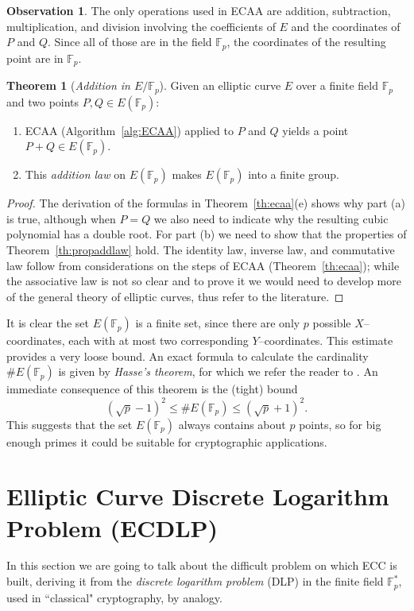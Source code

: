 \documentclass[9pt]{article}
\theoremstyle{definition}
\newtheorem{theorem}{Theorem}[section]
\newtheorem*{observation}{Observation}
\begin{document}
\begin{observation}
	The only operations used in ECAA are addition, subtraction, multiplication, and division involving the coefficients of $E$ and the coordinates of $P$ and $Q$. Since all of those are in the field $\mathbb{F}_p$, the coordinates of the resulting point are in $\mathbb{F}_p$.
\end{observation}

\begin{theorem}[\textit{Addition in $E/\mathbb{F}_p$}]
	Given an elliptic curve $E$ over a finite field $\mathbb{F}_p$ and two points $P, Q \in E(\mathbb{F}_p)$:
	\begin{enumerate}[label=(\alph*)]
		\item ECAA (Algorithm~\ref{alg:ECAA}) applied to $P$ and $Q$ yields a point $P + Q \in E(\mathbb{F}_p)$.
		\item This \textit{addition law} on $E(\mathbb{F}_p)$ makes $E(\mathbb{F}_p)$ into a finite group.
	\end{enumerate}
\end{theorem}
\begin{proof}
	The derivation of the formulas in Theorem~\ref{th:ecaa}(e) shows why part (a) is true, although when $P = Q$ we also need to indicate why the resulting cubic polynomial has a double root. For part (b) we need to show that the properties of Theorem~\ref{th:propaddlaw} hold. The identity law, inverse law, and commutative law follow from considerations on the steps of ECAA (Theorem~\ref{th:ecaa}); while the associative law is not so clear and to prove it we would need to develop more of the general theory of elliptic curves, thus refer to the literature.
\end{proof}

It is clear the set $E(\mathbb{F}_p)$ is a finite set, since there are only $p$ possible $X$--coordinates, each with at most two corresponding $Y$--coordinates. This estimate provides a very loose bound. An exact formula to calculate the cardinality $\#E(\mathbb{F}_p)$ is given by \textit{Hasse's theorem}, for which we refer the reader to \cite[Theorem~5.11]{JH08}. An immediate consequence of this theorem is the (tight) bound
$$(\sqrt{p} - 1)^2 \leq \#E(\mathbb{F}_p) \leq (\sqrt{p} + 1)^2.$$
This suggests that the set $E(\mathbb{F}_p)$ always contains about $p$ points, so for big enough primes it could be suitable for cryptographic applications.


\section{Elliptic Curve Discrete Logarithm Problem (ECDLP)}
In this section we are going to talk about the difficult problem on which ECC is built, deriving it from the \textit{discrete logarithm problem} (DLP) in the finite field $\mathbb{F}_p^\ast$, used in ``classical" cryptography, by analogy.
\end{document}
